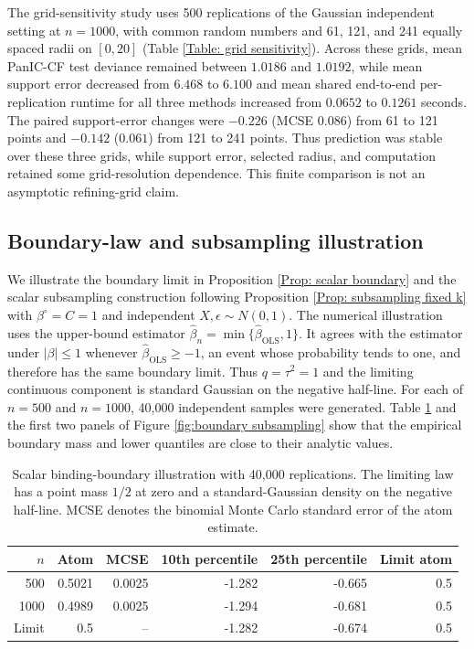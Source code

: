 \documentclass[12pt]{article}
\newenvironment{bluechange}{\begingroup\color[rgb]{0.00,0.00,1.00}}{\endgroup}
\theoremstyle{remark}
\theoremstyle{plain}
\begin{document}
\begin{bluechange}
The grid-sensitivity study uses 500 replications of the Gaussian independent setting at $n=1000$, with common random numbers and 61, 121, and 241 equally spaced radii on $[0,20]$ (Table \ref{Table: grid sensitivity}). Across these grids, mean PanIC-CF test deviance remained between $1.0186$ and $1.0192$, while mean support error decreased from $6.468$ to $6.100$ and mean shared end-to-end per-replication runtime for all three methods increased from $0.0652$ to $0.1261$ seconds. The paired support-error changes were $-0.226$ (MCSE $0.086$) from 61 to 121 points and $-0.142$ ($0.061$) from 121 to 241 points. Thus prediction was stable over these three grids, while support error, selected radius, and computation retained some grid-resolution dependence. This finite comparison is not an asymptotic refining-grid claim.

\subsection{Boundary-law and subsampling illustration}
We illustrate the boundary limit in Proposition \ref{Prop: scalar boundary} and the scalar subsampling construction following Proposition \ref{Prop: subsampling fixed k} with $\beta^\circ=C=1$ and independent $X,\epsilon\sim N(0,1)$. The numerical illustration uses the upper-bound estimator $\widehat\beta_n=\min\{\widehat\beta_{\mathrm{OLS}},1\}$. It agrees with the estimator under $|\beta|\le1$ whenever $\widehat\beta_{\mathrm{OLS}}\ge-1$, an event whose probability tends to one, and therefore has the same boundary limit. Thus $q=\tau^2=1$ and the limiting continuous component is standard Gaussian on the negative half-line. For each of $n=500$ and $n=1000$, 40,000 independent samples were generated. Table \ref{Table: boundary illustration} and the first two panels of Figure \ref{fig:boundary subsampling} show that the empirical boundary mass and lower quantiles are close to their analytic values.

\begin{table}[H]
\centering
\caption{Scalar binding-boundary illustration with 40,000 replications. The limiting law has a point mass $1/2$ at zero and a standard-Gaussian density on the negative half-line. MCSE denotes the binomial Monte Carlo standard error of the atom estimate.}
\label{Table: boundary illustration}
\small
\begin{tabular}{rrrrrr}
\hline
$n$ & Atom & MCSE & 10th percentile & 25th percentile & Limit atom \\
\hline
500 & 0.5021 & 0.0025 & -1.282 & -0.665 & 0.5 \\
1000 & 0.4989 & 0.0025 & -1.294 & -0.681 & 0.5 \\
Limit & 0.5 & -- & -1.282 & -0.674 & 0.5 \\
\hline
\end{tabular}
\end{table}



\end{bluechange}
\end{document}
